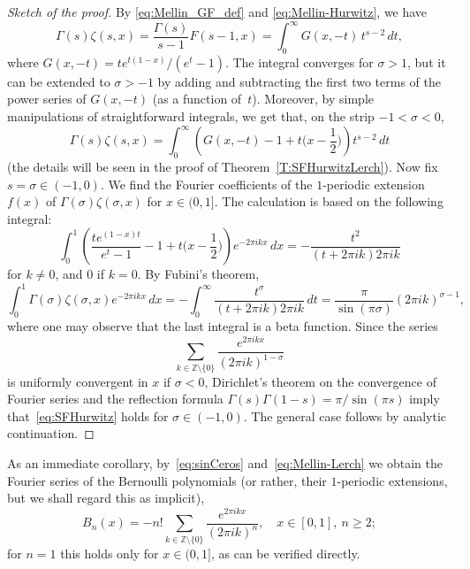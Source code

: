 \documentclass[11pt,a4paper]{amsart}
\newcommand{\Z}{\mathbb{Z}}
\theoremstyle{plain}
\theoremstyle{plain}
\theoremstyle{plain}
\theoremstyle{remark}
\begin{document}
\begin{proof}[Sketch of the proof]
By \eqref{eq:Mellin_GF_def} and \eqref{eq:Mellin-Hurwitz}, we have
\[
 \Gamma(s) \zeta(s,x) = \frac{\Gamma(s)}{s-1}F(s-1,x) = \int_0^\infty G(x,-t)\,t^{s-2}\,dt,
\]
where $G(x,-t) = te^{t(1-x)}/(e^t-1)$.
The integral converges for $\sigma>1$, but it can be extended to $\sigma>-1$ by adding and subtracting the first two terms of the power series of $G(x,-t)$ (as a function of~$t$). Moreover, by simple manipulations of straightforward integrals, we get that, on the strip $-1<\sigma<0$, 
\begin{equation}
\label{eq:2sumandos}
  \Gamma(s) \zeta(s,x) = \int_0^\infty \left(G(x,-t)-1+t\Big(x-\frac12\Big)\right) t^{s-2}\,dt
\end{equation}
(the details will be seen in the proof of Theorem~\ref{T:SFHurwitzLerch}).
Now fix $s=\sigma\in (-1,0)$. We find the Fourier coefficients of the $1$-periodic extension $f(x)$ of $\Gamma(\sigma)\zeta(\sigma,x)$ for $x\in (0,1]$. The calculation is based on the following integral:
\[
  \int_0^1 \left(\frac{te^{(1-x)t}}{e^t-1}-1 + t\Big(x-\frac12\Big)\right)e^{-2\pi ikx}\,dx
  = -\frac{t^2}{(t+2\pi i k)2\pi i k}
\]
for $k\not=0$, and $0$ if $k=0$. By Fubini's theorem,
\[
  \int_0^1 \Gamma(\sigma)\zeta(\sigma,x)e^{-2\pi ikx}\,dx
  = -\int_0^\infty \frac{t^\sigma}{(t+2\pi i k)2\pi i k}\,dt
  = \frac{\pi}{\sin(\pi \sigma)} (2\pi i k)^{\sigma-1},
\]
where one may observe that the last integral is a beta function. Since the series
\[
  \sum_{k\in\Z \setminus \{0\}}\frac{e^{2\pi ikx}}{(2\pi i k)^{1-\sigma}}
\]
is uniformly convergent in $x$ if $\sigma<0$, Dirichlet's theorem on the convergence of Fourier series and the reflection formula $\Gamma(s)\Gamma(1-s) = \pi/\sin(\pi s)$ imply that~\eqref{eq:SFHurwitz} holds for $\sigma\in (-1,0)$. The general case follows by analytic continuation.
\end{proof}


As an immediate corollary, by~\eqref{eq:sinCeros} and~\eqref{eq:Mellin-Lerch} we obtain the Fourier series of the Bernoulli polynomials (or rather, their $1$-periodic extensions, but we shall regard this as implicit),
\begin{equation}
\label{eq:Mellin-HurwitzFou}
  B_n(x) = -n!\sum_{k\in\Z \setminus \{0\}} \frac{e^{2\pi ikx}}{(2\pi i k)^{n}},
  \quad x\in[0,1],\ n\geq 2;
\end{equation}
for $n=1$ this holds only for $x\in (0,1]$, as can be verified directly.
\end{document}
